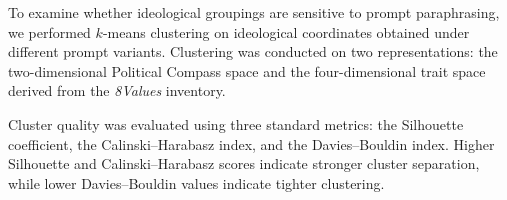 \documentclass[11pt]{article}
\begin{document}
To examine whether ideological groupings are sensitive to prompt paraphrasing,
we performed $k$-means clustering on ideological coordinates obtained under
different prompt variants. Clustering was conducted on two representations:
the two-dimensional Political Compass space and the four-dimensional trait
space derived from the \textit{8Values} inventory.

Cluster quality was evaluated using three standard metrics: the Silhouette
coefficient, the Calinski--Harabasz index, and the Davies--Bouldin index.
Higher Silhouette and Calinski--Harabasz scores indicate stronger cluster
separation, while lower Davies–Bouldin values indicate tighter clustering.

\end{document}
